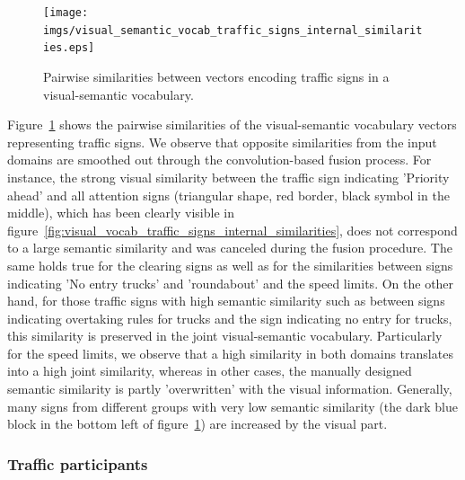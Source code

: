 \begin{figure}[t]
    \centering
    \texttt{[image: imgs/visual\_semantic\_vocab\_traffic\_signs\_internal\_similarities.eps]}
    \caption{Pairwise similarities between vectors encoding traffic signs in a visual-semantic vocabulary.}
    \label{fig:visual_semantic_vocab_traffic_signs_internal_similarities}
\end{figure}

Figure~\ref{fig:visual_semantic_vocab_traffic_signs_internal_similarities} shows the pairwise similarities of the visual-semantic vocabulary vectors representing traffic signs.
We observe that opposite similarities from the input domains are smoothed out through the convolution-based fusion process.
For instance, the strong visual similarity between the traffic sign indicating 'Priority ahead' and all attention signs (triangular shape, red border, black symbol in the middle), which has been clearly visible in figure~\ref{fig:visual_vocab_traffic_signs_internal_similarities}, does not correspond to a large semantic similarity and was canceled during the fusion procedure.
The same holds true for the clearing signs as well as for the similarities between signs indicating 'No entry trucks' and 'roundabout' and the speed limits.
On the other hand, for those traffic signs with high semantic similarity such as between signs indicating overtaking rules for trucks and the sign indicating no entry for trucks, this similarity is preserved in the joint visual-semantic vocabulary. 
Particularly for the speed limits, we observe that a high similarity in both domains translates into a high joint similarity, whereas in other cases, the manually designed semantic similarity is partly 'overwritten' with the visual information.
Generally, many signs from different groups with very low semantic similarity (the dark blue block in the bottom left of figure~\ref{fig:visual_semantic_vocab_traffic_signs_internal_similarities}) are increased by the visual part. 

\subsubsection{Traffic participants}%
\label{ssubsec:traffic_participants}

